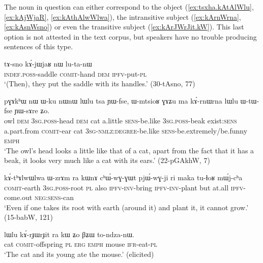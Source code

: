 The noun in question can either correspond to the object (\ref{ex:tsxha.kAtAlWlu}, \ref{ex:kAjWjaR}, \ref{ex:kAthAlwWlwa}), the intransitive subject (\ref{ex:kArnWrna}, \ref{ex:kAsnWsno}) or even the transitive subject (\ref{ex:kArJWrJit.kW}). This last option is not attested in the text corpus, but speakers have no trouble producing sentences of this type.


\begin{exe}
\ex \label{ex:kAjWjaR}
\gll tɤ-sno 	kɤ́-jɯ\redp{}jaʁ 	nɯ 	lu-ta-nɯ \\
\textsc{indef.poss}-saddle \textsc{comit}-hand \textsc{dem} \textsc{ipfv}-put-\textsc{pl} \\
\glt `(Then), they put the saddle with its handles.' (30-tAsno, 77)
\end{exe}
 

\begin{exe}
\ex \label{ex:kArnWrna}
\gll pɣɤkʰɯ 	nɯ 	ɯ-ku 	nɯnɯ 	lɯlu 	tsa 	ɲɯ-fse, 	ɯ-mtsioʁ 	ɣɤʑu 	ma kɤ́-rnɯ\redp{}rna 	lɯlu 	ɯ-tɯ-fse 	ɲɯ-sɤre 	ʑo. \\
owl \textsc{dem} \textsc{3sg.poss}-head \textsc{dem} cat a.little \textsc{sens}-be.like \textsc{3sg.poss}-beak exist:\textsc{sens} a.part.from \textsc{comit}-ear cat \textsc{3sg-nmlz:degree}-be.like \textsc{sens}-be.extremely/be.funny \textsc{emph} \\
\glt `The owl's head looks a little like that of a cat, apart from the fact that it has a beak, it looks very much like a cat with its ears.' (22-pGAkhW, 7)
\end{exe}


\begin{exe}
\ex \label{ex:kAthAlwWlwa}
\gll kɤ́-tʰɤlwɯ\tld{}lwa 	ɯ-zrɤm 	ra 	kɯnɤ 	cʰɯ́-wɣ-ɣɯt 	pjɯ́-wɣ-ji 	ri 	maka 	tu-ɬoʁ 	mɯ́j-cʰa \\  
\textsc{comit}-earth \textsc{3sg.poss}-root \textsc{pl} also \textsc{ipfv-inv}-bring \textsc{ipfv-inv}-plant but at.all \textsc{ipfv}-come.out \textsc{neg:sens}-can \\
\glt `Even if one takes its root with earth (around it) and plant it, it cannot grow.' (15-babW, 121)
\end{exe}


\begin{exe}
\ex \label{ex:kArJWrJit.kW}
\gll lɯlu	kɤ́-rɟɯ\tld{}rɟit	ra	kɯ	ʑo	βʑɯ	 to-ndza-nɯ. \\
cat \textsc{comit}-offspring \textsc{pl}  \textsc{erg} \textsc{emph} mouse \textsc{ifr}-eat-\textsc{pl} \\
\glt `The cat and its young ate the mouse.' (elicited)
\end{exe}

